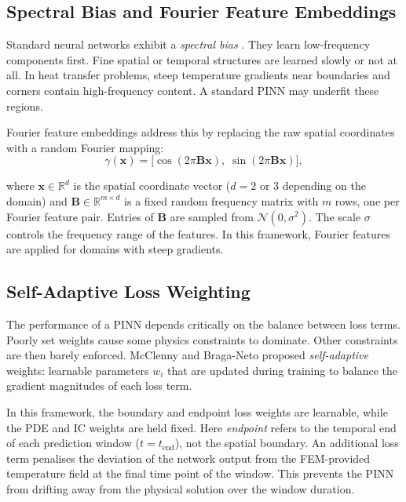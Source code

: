 \subsection{Spectral Bias and Fourier Feature Embeddings}

Standard neural networks exhibit a \emph{spectral bias} \cite{rahaman2019}.
They learn low-frequency components first.
Fine spatial or temporal structures are learned slowly or not at all.
In heat transfer problems, steep temperature gradients near boundaries and
corners contain high-frequency content.
A standard PINN may underfit these regions.

Fourier feature embeddings \cite{tancik2020} address this by replacing the
raw spatial coordinates with a random Fourier mapping:
\begin{equation}
\gamma(\mathbf{x}) = \bigl[\cos(2\pi \mathbf{B}\mathbf{x}),\;
                            \sin(2\pi \mathbf{B}\mathbf{x})\bigr],
\end{equation}

where $\mathbf{x} \in \mathbb{R}^d$ is the spatial coordinate vector ($d=2$
or $3$ depending on the domain) and $\mathbf{B} \in \mathbb{R}^{m\times d}$
is a fixed random frequency matrix with $m$ rows, one per Fourier feature pair.
Entries of $\mathbf{B}$ are sampled from $\mathcal{N}(0,\sigma^2)$.
The scale $\sigma$ controls the frequency range of the features.
In this framework, Fourier features are applied for domains with steep
gradients.

\subsection{Self-Adaptive Loss Weighting}

The performance of a PINN depends critically on the balance between loss terms.
Poorly set weights cause some physics constraints to dominate.
Other constraints are then barely enforced.
McClenny and Braga-Neto \cite{mcclenny2023} proposed \emph{self-adaptive}
weights: learnable parameters $w_i$ that are updated during training to balance
the gradient magnitudes of each loss term.

In this framework, the boundary and endpoint loss weights are learnable, while
the PDE and IC weights are held fixed.
Here \emph{endpoint} refers to the temporal end of each prediction window
($t = t_\mathrm{end}$), not the spatial boundary.
An additional loss term penalises the deviation of the network output from the
FEM-provided temperature field at the final time point of the window.
This prevents the PINN from drifting away from the physical solution over the
window duration.

